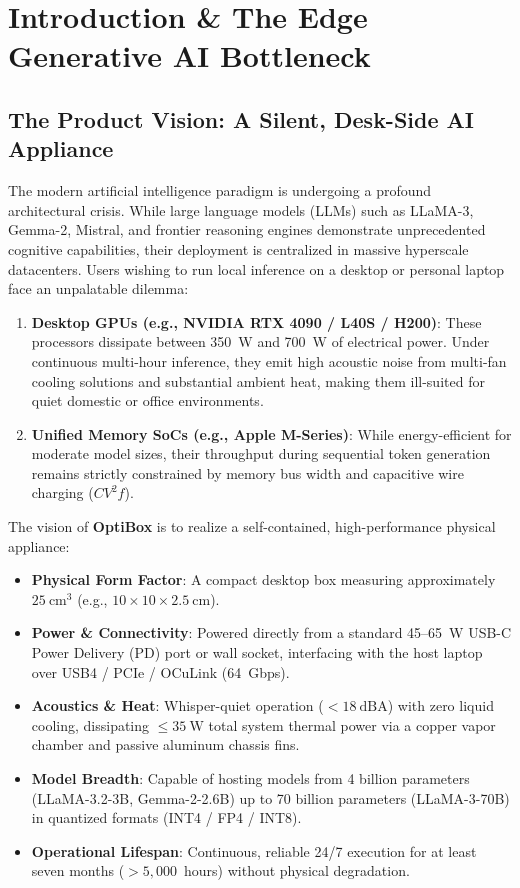 \documentclass[11pt,a4paper]{report}
\begin{document}
\tableofcontents

\chapter{Introduction \& The Edge Generative AI Bottleneck}

\section{The Product Vision: A Silent, Desk-Side AI Appliance}
The modern artificial intelligence paradigm is undergoing a profound architectural crisis. While large language models (LLMs) such as LLaMA-3, Gemma-2, Mistral, and frontier reasoning engines demonstrate unprecedented cognitive capabilities, their deployment is centralized in massive hyperscale datacenters. Users wishing to run local inference on a desktop or personal laptop face an unpalatable dilemma:
\begin{enumerate}
\item \textbf{Desktop GPUs (e.g., NVIDIA RTX 4090 / L40S / H200)}: These processors dissipate between 350~W and 700~W of electrical power. Under continuous multi-hour inference, they emit high acoustic noise from multi-fan cooling solutions and substantial ambient heat, making them ill-suited for quiet domestic or office environments.
\item \textbf{Unified Memory SoCs (e.g., Apple M-Series)}: While energy-efficient for moderate model sizes, their throughput during sequential token generation remains strictly constrained by memory bus width and capacitive wire charging ($CV^2f$).
\end{enumerate}

The vision of \textbf{OptiBox} is to realize a self-contained, high-performance physical appliance:
\begin{itemize}
\item \textbf{Physical Form Factor}: A compact desktop box measuring approximately $25~\text{cm}^3$ (e.g., $10 \times 10 \times 2.5~\text{cm}$).
\item \textbf{Power \& Connectivity}: Powered directly from a standard 45--65~W USB-C Power Delivery (PD) port or wall socket, interfacing with the host laptop over USB4 / PCIe / OCuLink (64~Gbps).
\item \textbf{Acoustics \& Heat}: Whisper-quiet operation ($<18~\text{dBA}$) with zero liquid cooling, dissipating $\le 35~\text{W}$ total system thermal power via a copper vapor chamber and passive aluminum chassis fins.
\item \textbf{Model Breadth}: Capable of hosting models from 4 billion parameters (LLaMA-3.2-3B, Gemma-2-2.6B) up to 70 billion parameters (LLaMA-3-70B) in quantized formats (INT4 / FP4 / INT8).
\item \textbf{Operational Lifespan}: Continuous, reliable 24/7 execution for at least seven months ($>5,000$~hours) without physical degradation.
\end{itemize}
\end{document}

